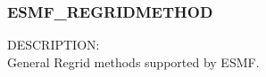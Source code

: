 
%
%


\subsubsection{ESMF\_REGRIDMETHOD}

{\sf DESCRIPTION:\\}
General Regrid methods supported by ESMF.

